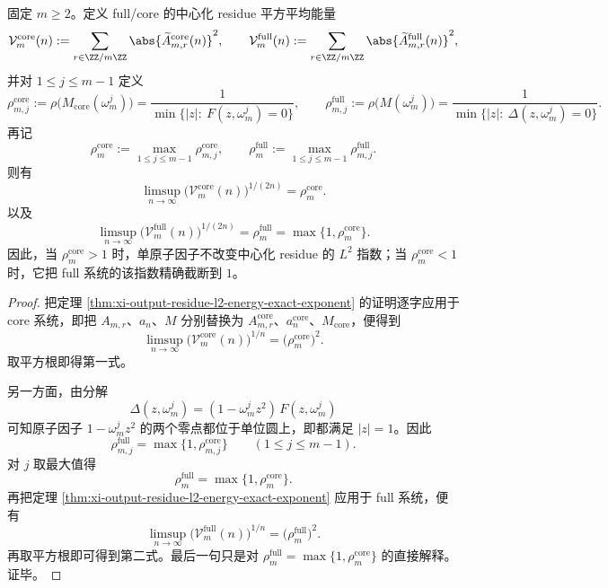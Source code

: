 \begin{corollary}\label{cor:xi-single-atom-centered-residue-l2-exponent-truncation}
固定 \(m\ge 2\)。定义 full/core 的中心化 residue 平方平均能量
\[
\mathcal V_m^{\mathrm{core}}(n):=\sum_{r\in\ZZ/m\ZZ}\abs{\widetilde A_{m,r}^{\mathrm{core}}(n)}^2,
\qquad
\mathcal V_m^{\mathrm{full}}(n):=\sum_{r\in\ZZ/m\ZZ}\abs{\widetilde A_{m,r}^{\mathrm{full}}(n)}^2,
\]
并对 \(1\le j\le m-1\) 定义
\[
\rho_{m,j}^{\mathrm{core}}
:=
\rho\!\bigl(M_{\mathrm{core}}(\omega_m^j)\bigr)
=
\frac{1}{\min\{|z|:\ F(z,\omega_m^j)=0\}},
\qquad
\rho_{m,j}^{\mathrm{full}}
:=
\rho\!\bigl(M(\omega_m^j)\bigr)
=
\frac{1}{\min\{|z|:\ \Delta(z,\omega_m^j)=0\}}.
\]
再记
\[
\rho_m^{\mathrm{core}}:=\max_{1\le j\le m-1}\rho_{m,j}^{\mathrm{core}},
\qquad
\rho_m^{\mathrm{full}}:=\max_{1\le j\le m-1}\rho_{m,j}^{\mathrm{full}}.
\]
则有
\[
\boxed{\;
\limsup_{n\to\infty}\bigl(\mathcal V_m^{\mathrm{core}}(n)\bigr)^{1/(2n)}
=
\rho_m^{\mathrm{core}}.\;}
\]
以及
\[
\boxed{\;
\limsup_{n\to\infty}\bigl(\mathcal V_m^{\mathrm{full}}(n)\bigr)^{1/(2n)}
=
\rho_m^{\mathrm{full}}
=
\max\{1,\rho_m^{\mathrm{core}}\}.\;}
\]
因此，当 \(\rho_m^{\mathrm{core}}>1\) 时，单原子因子不改变中心化 residue 的 \(L^2\) 指数；当 \(\rho_m^{\mathrm{core}}<1\) 时，它把 full 系统的该指数精确截断到 \(1\)。
\end{corollary}
\begin{proof}
把定理 \ref{thm:xi-output-residue-l2-energy-exact-exponent} 的证明逐字应用于 core 系统，即把 \(A_{m,r}\)、\(a_n\)、\(M\) 分别替换为 \(A_{m,r}^{\mathrm{core}}\)、\(a_n^{\mathrm{core}}\)、\(M_{\mathrm{core}}\)，便得到
\[
\limsup_{n\to\infty}\bigl(\mathcal V_m^{\mathrm{core}}(n)\bigr)^{1/n}
=
\bigl(\rho_m^{\mathrm{core}}\bigr)^2.
\]
取平方根即得第一式。

另一方面，由分解
\[
\Delta(z,\omega_m^j)=(1-\omega_m^j z^2)\,F(z,\omega_m^j)
\]
可知原子因子 \(1-\omega_m^j z^2\) 的两个零点都位于单位圆上，即都满足 \(|z|=1\)。因此
\[
\rho_{m,j}^{\mathrm{full}}
=
\max\{1,\rho_{m,j}^{\mathrm{core}}\}
\qquad(1\le j\le m-1).
\]
对 \(j\) 取最大值得
\[
\rho_m^{\mathrm{full}}=\max\{1,\rho_m^{\mathrm{core}}\}.
\]
再把定理 \ref{thm:xi-output-residue-l2-energy-exact-exponent} 应用于 full 系统，便有
\[
\limsup_{n\to\infty}\bigl(\mathcal V_m^{\mathrm{full}}(n)\bigr)^{1/n}
=
\bigl(\rho_m^{\mathrm{full}}\bigr)^2.
\]
再取平方根即可得到第二式。最后一句只是对
\(
\rho_m^{\mathrm{full}}=\max\{1,\rho_m^{\mathrm{core}}\}
\)
的直接解释。证毕。
\end{proof}

\endinput
